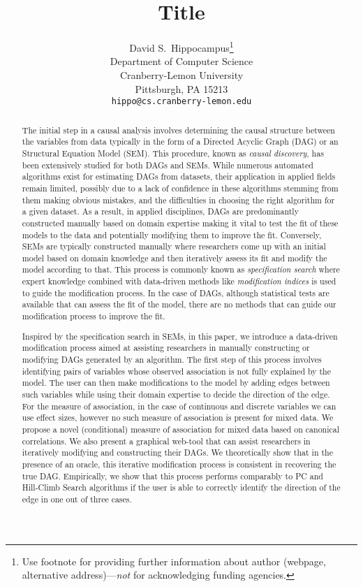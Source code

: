 \documentclass{article}
\title{Title}
\author{%
  David S.~Hippocampus\thanks{Use footnote for providing further information
    about author (webpage, alternative address)---\emph{not} for acknowledging
    funding agencies.} \\
  Department of Computer Science\\
  Cranberry-Lemon University\\
  Pittsburgh, PA 15213 \\
  \texttt{hippo@cs.cranberry-lemon.edu} \\
}
\begin{document}
\maketitle

\begin{abstract}
	The initial step in a causal analysis involves determining the causal
	structure between the variables from data typically in the form of a
	Directed Acyclic Graph (DAG) or an Structural Equation Model (SEM).
	This procedure, known as \emph{causal discovery}, has been extensively
	studied for both DAGs and SEMs. While numerous automated algorithms
	exist for estimating DAGs from datasets, their application in applied
	fields remain limited, possibly due to a lack of confidence in these
	algorithms stemming from them making obvious mistakes, and the
	difficulties in choosing the right algorithm for a given dataset. As a
	result, in applied disciplines, DAGs are predominantly constructed
	manually based on domain expertise making it vital to test the fit of
	these models to the data and potentially modifying them to improve the
	fit. Conversely, SEMs are typically constructed manually where
	researchers come up with an initial model based on domain knowledge and
	then iteratively assess its fit and modify the model according to that.
	This process is commonly known as \emph{specification search} where
	expert knowledge combined with data-driven methods like
	\emph{modification indices} is used to guide the modification process.
	In the case of DAGs, although statistical tests are available that can
	assess the fit of the model, there are no methods that can guide our
	modification process to improve the fit.

	Inspired by the specification search in SEMs, in this paper, we
	introduce a data-driven modification process aimed at assisting
	researchers in manually constructing or modifying DAGs generated by an
	algorithm. The first step of this process involves identifying pairs of
	variables whose observed association is not fully explained by the
	model. The user can then make modifications to the model by adding
	edges between such variables while using their domain expertise to
	decide the direction of the edge. For the measure of association, in
	the case of continuous and discrete variables we can use effect sizes,
	however no such measure of association is present for mixed data. We
	propose a novel (conditional) measure of association for mixed data
	based on canonical correlations. We also present a graphical web-tool
	that can assist researchers in iteratively modifying and constructing
	their DAGs. We theoretically show that in the presence of an oracle,
	this iterative modification process is consistent in recovering the
	true DAG. Empirically, we show that this process performs comparably to
	PC and Hill-Climb Search algorithms if the user is able to correctly
	identify the direction of the edge in one out of three cases.
\end{abstract}
\end{document}
